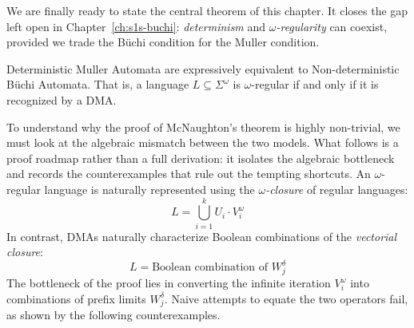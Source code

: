 We are finally ready to state the central theorem of this chapter. It closes the gap left open in Chapter~\ref{ch:s1s-buchi}: \emph{determinism} and \emph{$\omega$-regularity} can coexist, provided we trade the Büchi condition for the Muller condition.

\begin{theorem}[McNaughton, 1966]
Deterministic Muller Automata are expressively equivalent to Non-deterministic Büchi Automata. That is, a language $L \subseteq \Sigma^\omega$ is $\omega$-regular if and only if it is recognized by a DMA.
\end{theorem}


To understand why the proof of McNaughton's theorem is highly non-trivial, we must look at the algebraic mismatch between the two models. What follows is a proof roadmap rather than a full derivation: it isolates the algebraic bottleneck and records the counterexamples that rule out the tempting shortcuts. An $\omega$-regular language is naturally represented using the \emph{$\omega$-closure} of regular languages:
$$L = \bigcup_{i=1}^k U_i \cdot V_i^\omega$$
In contrast, DMAs naturally characterize Boolean combinations of the \emph{vectorial closure}:
$$L = \text{Boolean combination of } W_j^\delta$$
The bottleneck of the proof lies in converting the infinite iteration $V_i^\omega$ into combinations of prefix limits $W_j^\delta$. Naive attempts to equate the two operators fail, as shown by the following counterexamples.

